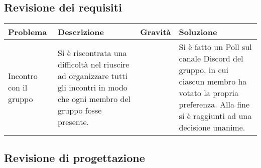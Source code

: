 \subsection{Revisione dei requisiti}\label{ValutazionePerIlMiglioramentoValutazioneSuOrganizzazioneRevisioneDeiRequisiti}

\quad
\def\tabularxcolumn#1{m{#1}}
{

	\begin{center}
		\renewcommand{\arraystretch}{1.4}
		\begin{tabularx}{\textwidth}[c]{|p{}|p{5cm}|p{}|p{}|}
			\hline
			\rowcolor{airforceblue}
			\textbf{Problema} & \textbf{Descrizione} & \textbf{Gravità} & \textbf{Soluzione}\\
			\hline
			Incontro con il gruppo & Si è riscontrata una difficoltà nel riuscire ad organizzare tutti gli incontri in modo che ogni membro del gruppo fosse presente. & \centering2 & Si è fatto un Poll sul canale Discord del gruppo, in cui ciascun membro ha votato la propria preferenza. Alla fine si è raggiunti ad una decisione unanime. \\
			 \hline
		\end{tabularx}
	\end{center}

\subsection{Revisione di progettazione}\label{ValutazionePerIlMiglioramentoValutazioneSuOrganizzazioneRevisioneDiProgettazione}

\quad
\def\tabularxcolumn#1{m{#1}}
{

}}

